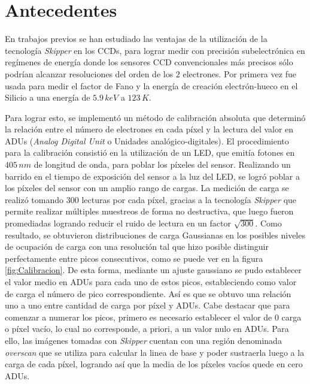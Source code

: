 \section{Antecedentes \label{sec:Antecedentes}}
\noindent En trabajos previos se han estudiado las ventajas de la utilización de la tecnología \textit{Skipper} en los CCDs, para lograr medir con precisión subelectrónica en regímenes de energía donde los sensores CCD convencionales más precisos sólo podrían alcanzar resoluciones del orden de los $2$ electrones. Por primera vez fue usada para medir el factor de Fano y la energía de creación electrón-hueco en el Silicio a una energía de $5.9\,\si{keV}$ a $123\,\si{K}$\cite{Rodrigues}.

Para lograr esto, se implementó un método de calibración absoluta que determinó la relación entre el número de electrones en cada píxel y la lectura del valor en ADUs (\textit{Analog Digital Unit} o Unidades analógico-digitales). El procedimiento para la calibración consistió en la utilización de un LED, que emitía fotones en $405\,\si{nm}$ de longitud de onda, para poblar los píxeles del sensor. Realizando un barrido en el tiempo de exposición del sensor a la luz del LED, se logró poblar a los píxeles del sensor con un amplio rango de cargas. La medición de carga se realizó tomando $300$ lecturas por cada píxel, gracias a la tecnología \textit{Skipper} que permite realizar múltiples muestreos de forma no destructiva, que luego fueron promediadas logrando reducir el ruido de lectura en un factor $\sqrt{300}$. Como resultado, se obtuvieron distribuciones de carga Gaussianas en los posibles niveles de ocupación de carga con una resolución tal que hizo posible distinguir perfectamente entre picos consecutivos, como se puede ver en la figura \ref{fig:Calibracion}. De esta forma, mediante un ajuste gaussiano se pudo establecer el valor medio en ADUs para cada uno de estos picos, estableciendo como valor de carga el número de pico correspondiente. Así es que se obtuvo una relación uno a uno entre cantidad de carga por píxel y ADUs. Cabe destacar que para comenzar a numerar los picos, primero es necesario establecer el valor de $0$ carga o píxel vacío, lo cual no corresponde, a priori, a un valor nulo en ADUs. Para ello, las imágenes tomadas con \textit{Skipper} cuentan con una región denominada \textit{overscan} que se utiliza para calcular la linea de base y poder sustraerla luego a la carga de cada píxel, logrando así que la media de los píxeles vacíos quede en cero ADUs.
